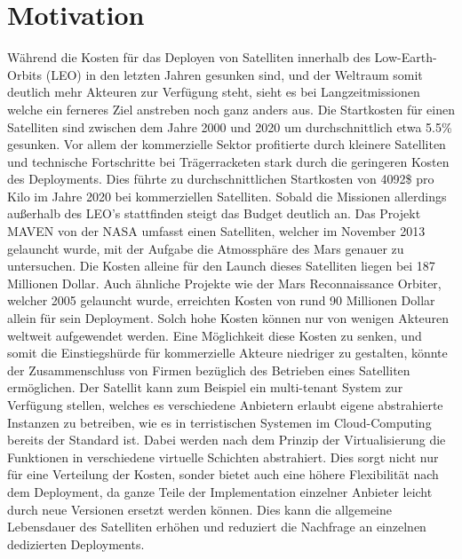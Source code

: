 \documentclass[
  ngerman,
  symmetric,
  cdfont=on,
  numbers=noenddot,
  parskip
]{tudscrreprt}
\begin{document}
\section{Motivation}
Während die Kosten für das Deployen von Satelliten innerhalb des Low-Earth-Orbits (LEO) in den letzten Jahren gesunken sind, und der Weltraum somit deutlich mehr Akteuren zur Verfügung steht, sieht es bei Langzeitmissionen welche ein ferneres Ziel anstreben noch ganz anders aus. Die Startkosten für einen Satelliten sind zwischen dem Jahre 2000 und 2020 um durchschnittlich etwa 5.5\% gesunken.\cite{launch_cost_reduction} Vor allem der kommerzielle Sektor profitierte durch kleinere Satelliten und technische Fortschritte bei Trägerracketen stark durch die geringeren Kosten des Deployments. Dies führte zu durchschnittlichen Startkosten von 4092\$ pro Kilo im Jahre 2020 bei kommerziellen Satelliten. 
Sobald die Missionen allerdings außerhalb des LEO's stattfinden steigt das Budget deutlich an. Das Projekt MAVEN von der NASA umfasst einen Satelliten, welcher im November 2013 gelauncht wurde, mit der Aufgabe die Atmossphäre des Mars genauer zu untersuchen.\cite{MAVEN} Die Kosten alleine für den Launch dieses Satelliten liegen bei 187 Millionen Dollar.\cite{MAVEN_cost} Auch ähnliche Projekte wie der Mars Reconnaissance Orbiter, welcher 2005 gelauncht wurde, erreichten Kosten von rund 90 Millionen Dollar allein für sein Deployment.\cite{reconnaissance}
Solch hohe Kosten können nur von wenigen Akteuren weltweit aufgewendet werden. Eine Möglichkeit diese Kosten zu senken, und somit die Einstiegshürde für kommerzielle Akteure niedriger zu gestalten, könnte der Zusammenschluss von Firmen bezüglich des Betrieben eines Satelliten ermöglichen. Der Satellit kann zum Beispiel ein multi-tenant System zur Verfügung stellen, welches es verschiedene Anbietern erlaubt eigene abstrahierte Instanzen zu betreiben, wie es in terristischen Systemen im Cloud-Computing bereits der Standard ist. Dabei werden nach dem Prinzip der Virtualisierung die Funktionen in verschiedene virtuelle Schichten abstrahiert. Dies sorgt nicht nur für eine Verteilung der Kosten, sonder bietet auch eine höhere Flexibilität nach dem Deployment, da ganze Teile der Implementation einzelner Anbieter leicht durch neue Versionen ersetzt werden können. Dies kann die allgemeine Lebensdauer des Satelliten erhöhen und reduziert die Nachfrage an einzelnen dedizierten Deployments. 
\end{document}
